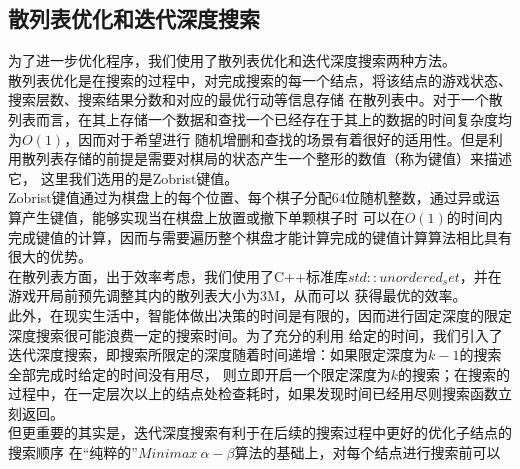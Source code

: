 \documentclass{acm_proc_article-sp}
\begin{document}
\subsection{\textbf{散列表优化和迭代深度搜索}}
为了进一步优化程序，我们使用了散列表优化和迭代深度搜索两种方法。\\
散列表优化是在搜索的过程中，对完成搜索的每一个结点，将该结点的游戏状态、搜索层数、搜索结果分数和对应的最优行动等信息存储
在散列表中。对于一个散列表而言，在其上存储一个数据和查找一个已经存在于其上的数据的时间复杂度均为$O(1)$，因而对于希望进行
随机增删和查找的场景有着很好的适用性。但是利用散列表存储的前提是需要对棋局的状态产生一个整形的数值（称为键值）来描述它，
这里我们选用的是Zobrist键值。\\
Zobrist键值通过为棋盘上的每个位置、每个棋子分配64位随机整数，通过异或运算产生键值，能够实现当在棋盘上放置或撤下单颗棋子时
可以在$O(1)$的时间内完成键值的计算，因而与需要遍历整个棋盘才能计算完成的键值计算算法相比具有很大的优势。\\
在散列表方面，出于效率考虑，我们使用了C++标准库$std::unordered_set$，并在游戏开局前预先调整其内的散列表大小为3M，从而可以
获得最优的效率。\\
此外，在现实生活中，智能体做出决策的时间是有限的，因而进行固定深度的限定深度搜索很可能浪费一定的搜索时间。为了充分的利用
给定的时间，我们引入了迭代深度搜索，即搜索所限定的深度随着时间递增：如果限定深度为$k-1$的搜索全部完成时给定的时间没有用尽，
则立即开启一个限定深度为$k$的搜索；在搜索的过程中，在一定层次以上的结点处检查耗时，如果发现时间已经用尽则搜索函数立刻返回。\\
但更重要的其实是，迭代深度搜索有利于在后续的搜索过程中更好的优化子结点的搜索顺序
在“纯粹的”$Minimax\ \alpha-\beta$算法的基础上，对每个结点进行搜索前可以
\end{document}
